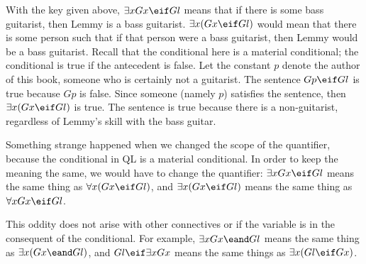 With the key given above, $\exists x Gx \eif Gl$ means that if there is some bass guitarist, then Lemmy is a bass guitarist. $\exists x (Gx \eif Gl)$ would mean that there is some person such that if that person were a bass guitarist, then Lemmy would be a bass guitarist. Recall that the conditional here is a material conditional; the conditional is true if the antecedent is false. Let the constant $p$ denote the author of this book, someone who is certainly not a guitarist. The sentence $Gp \eif Gl$ is true because $Gp$ is false. Since someone (namely $p$) satisfies the sentence, then $\exists x (Gx \eif Gl)$ is true. The sentence is true because there is a non-guitarist, regardless of Lemmy's skill with the bass guitar.

Something strange happened when we changed the scope of the quantifier, because the conditional in QL is a material conditional. In order to keep the meaning the same, we would have to change the quantifier: $\exists x Gx \eif Gl$ means the same thing as $\forall x (Gx \eif Gl)$, and $\exists x (Gx \eif Gl)$ means the same thing as $\forall x Gx \eif Gl$.

This oddity does not arise with other connectives or if the variable is in the consequent of the conditional. For example, $\exists x Gx \eand Gl$ means the same thing as $\exists x (Gx \eand Gl)$, and $Gl \eif \exists x Gx$ means the same things as $\exists x(Gl \eif Gx)$.


